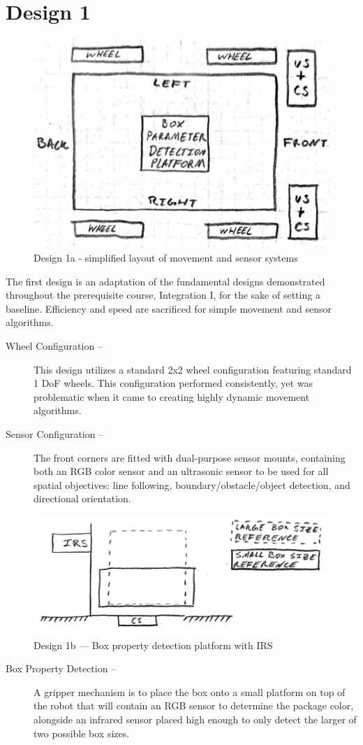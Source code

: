 \documentclass[11pt]{report}
\begin{document}
\section{Design 1}\label{sec:design1}
\begin{figure}[H]
    \centering
    \includegraphics[width=0.5\linewidth]{Images//Designs/Design1a.pdf}
    \caption{Design 1a - simplified layout of movement and sensor systems}
    \label{fig:design1a}
\end{figure}
The first design is an adaptation of the fundamental designs demonstrated throughout the prerequisite course, Integration I, for the sake of setting a baseline. Efficiency and speed are sacrificed for simple movement and sensor algorithms.

\begin{description}
    \item[Wheel Configuration --] This design utilizes a standard 2x2 wheel configuration featuring standard 1 \gls{DoF} wheels. This configuration performed consistently, yet was problematic when it came to creating highly dynamic movement algorithms.
    \item[Sensor Configuration --] The front corners are fitted with dual-purpose sensor mounts, containing both an \gls{RGB} color sensor and an ultrasonic sensor to be used for all spatial objectives: line following, boundary/obstacle/object detection, and directional orientation.
\end{description}

\begin{figure}[H]
    \centering
    \hspace*{6em}
    \includegraphics[width=0.6\linewidth]{Images//Designs/Design1b.pdf}
    \caption{Design 1b --- Box property detection platform with IRS}
    \label{fig:design1b}
\end{figure}
\begin{description}
    \item[Box Property Detection --]A gripper mechanism is to place the box onto a small platform on top of the robot that will contain an \gls{RGB} sensor to determine the package color, alongside an infrared sensor placed high enough to only detect the larger of two possible box sizes.
\end{description}
\end{document}
